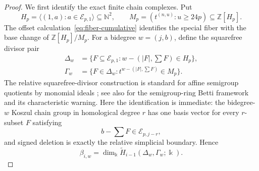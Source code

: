 \documentclass[11pt]{article}
\theoremstyle{definition}
\theoremstyle{remark}
\newcommand{\N}{\mathbb{N}}
\newcommand{\kfield}{\Bbbk}
\begin{document}
\begin{proof}
We first identify the exact finite chain complexes. Put
\[
H_p=\langle(1,a):a\in\mathcal E_{p,1}\rangle\subseteq\N^2,
\qquad
M_p=(t^{(n,u)}:u\ge24p)\subseteq\mathbb Z[H_p].
\]
The offset calculation~\eqref{eq:fiber-cumulative} identifies the special fiber with the base
change of \(\mathbb Z[H_p]/M_p\). For a bidegree \(w=(j,b)\), define the squarefree divisor pair
\begin{align*}
\Delta_w&=\{F\subseteq\mathcal E_{p,1}:w-(|F|,\sum F)\in H_p\},\\
\Gamma_w&=\{F\in\Delta_w:t^{w-(|F|,\sum F)}\in M_p\}.
\end{align*}
The relative squarefree-divisor construction is standard for affine semigroup quotients by
monomial ideals \cite{BrunsHerzog1997}; see also \cite{Stamate2018} for the semigroup-ring Betti
framework and its characteristic warning. Here the identification is immediate: the
bidegree-\(w\) Koszul chain group in homological degree \(r\) has one basis vector for every
\(r\)-subset \(F\) satisfying
\[
b-\sum F\in\mathcal E_{p,j-r},
\]
and signed deletion is exactly the relative simplicial boundary. Hence
\begin{equation}
\beta_{i,w}=\dim_{\kfield}\widetilde H_{i-1}(\Delta_w,\Gamma_w;\kfield).
\label{eq:relative-betti}
\end{equation}


\end{proof}
\end{document}
